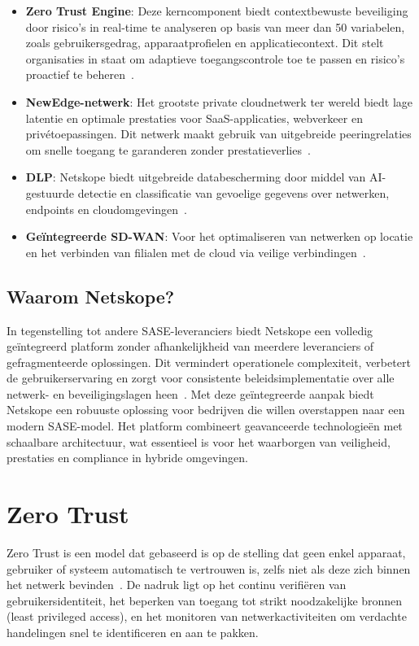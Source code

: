 \begin{itemize}
  \item \textbf{Zero Trust Engine}: Deze kerncomponent biedt contextbewuste beveiliging door risico's in real-time te analyseren op basis van meer dan 50 variabelen, zoals gebruikersgedrag, apparaatprofielen en applicatiecontext. Dit stelt organisaties in staat om adaptieve toegangscontrole toe te passen en risico's proactief te beheren~\autocite{Netskope2025-2}.
  \item \textbf{NewEdge-netwerk}: Het grootste private cloudnetwerk ter wereld biedt lage latentie en optimale prestaties voor SaaS-applicaties, webverkeer en privétoepassingen. Dit netwerk maakt gebruik van uitgebreide peeringrelaties om snelle toegang te garanderen zonder prestatieverlies~\autocite{Netskope2025-1}.
  \item \textbf{DLP}: Netskope biedt uitgebreide databescherming door middel van AI-gestuurde detectie en classificatie van gevoelige gegevens over netwerken, endpoints en cloudomgevingen~\autocite{Netskope2025-1}.
  \item \textbf{Geïntegreerde SD-WAN}: Voor het optimaliseren van netwerken op locatie en het verbinden van filialen met de cloud via veilige verbindingen~\autocite{Netskope2025-1}.
\end{itemize}

\subsection{Waarom Netskope?}
In tegenstelling tot andere SASE-leveranciers biedt Netskope een volledig geïntegreerd platform zonder afhankelijkheid van meerdere leveranciers of gefragmenteerde oplossingen. Dit vermindert operationele complexiteit, verbetert de gebruikerservaring en zorgt voor consistente beleidsimplementatie over alle netwerk- en beveiligingslagen heen~\autocite{Netskope2025-1}.
Met deze geïntegreerde aanpak biedt Netskope een robuuste oplossing voor bedrijven die willen overstappen naar een modern SASE-model. Het platform combineert geavanceerde technologieën met schaalbare architectuur, wat essentieel is voor het waarborgen van veiligheid, prestaties en compliance in hybride omgevingen.

\section{Zero Trust}
Zero Trust is een model dat gebaseerd is op de stelling dat geen enkel apparaat, gebruiker of systeem automatisch te vertrouwen is, zelfs niet als deze zich binnen het netwerk bevinden~\autocite{Netskope2024}.
De nadruk ligt op het continu verifiëren van gebruikersidentiteit, het beperken van toegang tot strikt noodzakelijke bronnen (least privileged access), en het monitoren van netwerkactiviteiten om verdachte handelingen snel te identificeren en aan te pakken.


